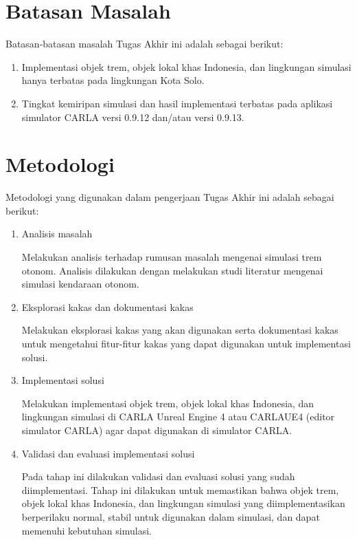 \section{Batasan Masalah}

Batasan-batasan masalah Tugas Akhir ini adalah sebagai berikut:

\begin{enumerate}

    \item Implementasi objek trem, objek lokal khas Indonesia, dan lingkungan
    simulasi hanya terbatas pada lingkungan Kota Solo.

    \item Tingkat kemiripan simulasi dan hasil implementasi terbatas pada
    aplikasi simulator CARLA versi 0.9.12 dan/atau versi 0.9.13.


\end{enumerate}

\section{Metodologi}

Metodologi yang digunakan dalam pengerjaan Tugas Akhir ini adalah sebagai
berikut:

\begin{enumerate}

    \item Analisis masalah

    Melakukan analisis terhadap rumusan masalah mengenai simulasi trem otonom.
    Analisis dilakukan dengan melakukan studi literatur mengenai simulasi
    kendaraan otonom.

    \item Eksplorasi kakas dan dokumentasi kakas

    Melakukan eksplorasi kakas yang akan digunakan serta dokumentasi kakas untuk
    mengetahui fitur-fitur kakas yang dapat digunakan untuk implementasi solusi.

    \item Implementasi solusi

    Melakukan implementasi objek trem, objek lokal khas Indonesia, dan
    lingkungan simulasi di CARLA Unreal Engine 4 atau CARLAUE4 (editor simulator
    CARLA) agar dapat digunakan di simulator CARLA.

    \item Validasi dan evaluasi implementasi solusi

    Pada tahap ini dilakukan validasi dan evaluasi solusi yang sudah
    diimplementasi. Tahap ini dilakukan untuk memastikan bahwa objek trem, objek
    lokal khas Indonesia, dan lingkungan simulasi yang diimplementasikan
    berperilaku normal, stabil untuk digunakan dalam simulasi, dan dapat
    memenuhi kebutuhan simulasi.

\end{enumerate}

